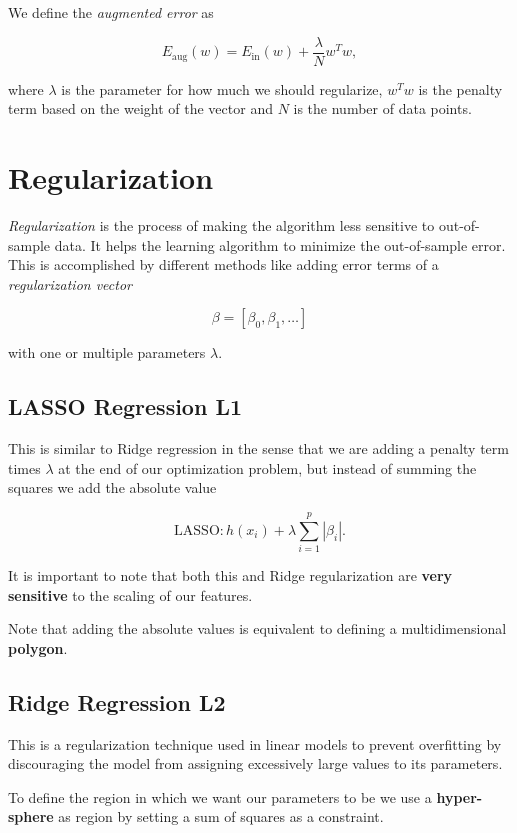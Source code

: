 We define the \emph{augmented error} as

\[
	E_{\text{aug}}(w) = E_{\text{in}}(w) + \frac{\lambda}{N}w^T w,
\]

where \(\lambda\) is the parameter for how much we should regularize, \(w^T w\) is the penalty term based on the weight of the vector and
\(N\) is the number of data points.

\section{Regularization}

\emph{Regularization} is the process of making the algorithm less sensitive to out-of-sample data.
It helps the learning algorithm to minimize the out-of-sample error. This is accomplished by different methods like adding error terms of a 
\emph{regularization vector} 

\[
	\beta = [\beta_0, \beta_1, \dots]
\]

with one or multiple parameters \(\lambda\).

\subsection{LASSO Regression L1}

This is similar to Ridge regression in the sense that we are adding a penalty term times \(\lambda\) at the end of our optimization problem, but
instead of summing the squares we add the absolute value

\[
	\mathrm{LASSO}: h(x_i)  + \lambda \sum_{i = 1}^{p} | \beta_i |.
\]

It is important to note that both this and Ridge regularization are \textbf{very sensitive} to the scaling of our features.

Note that adding the absolute values is equivalent to defining a multidimensional \textbf{polygon}.


\subsection{Ridge Regression L2}

This is a regularization technique used in linear models to prevent overfitting by discouraging the model from assigning
excessively large values to its parameters. 

To define the region in which we want our parameters to be we use a \textbf{hyper-sphere} as region by setting a sum of squares as a constraint.

